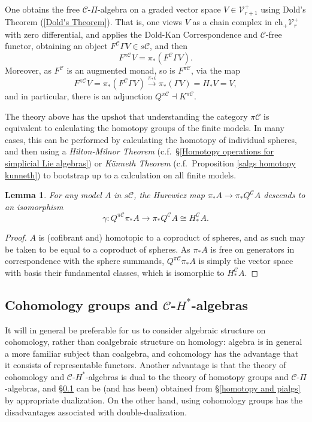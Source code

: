 \documentclass[11pt]{amsart} \renewcommand{\baselinestretch}{1.2}
\theoremstyle{plain}
\newtheorem{lem}[thm]{Lemma}
\numberwithin{equation}{section} %
\theoremstyle{plain}
\newtheorem{lem}[thm]{Lemma}
\numberwithin{equation}{chapter} %
\renewcommand{\to}{\longrightarrow}
\newcommand{\calC}{\mathcal{C}}
\newcommand{\calV}{\mathcal{V}}
\newcommand{\calc}{\mathcal{C}}
\newcommand{\vect}[2]{\calV^{#1}_{#2}}
\newcommand{\PA}[1]{\pi#1}
\newcommand{\complexes}{\mathrm{ch}_+}
\newcommand{\SubsectionOrSection}[1]{\subsection{#1}}
\begin{document}
\begin{Pi-algebras and cohomology algebras}
One obtains the free $\calc$-$\Pi$-algebra on a graded vector space $V\in \vect{+}{r+1}$ using Dold's Theorem (\ref{Dold's Theorem}). That is, one views $V$ as a chain complex in $\complexes\vect{+}{r}$ with zero differential, and applies the Dold-Kan Correspondence and $\calc$-free functor, obtaining an object $F^\calc\Gamma V\in s\calc$, and then
\[F^{\PA{\calc}}V=\pi_*(F^\calc\Gamma V).\]
Moreover, as $F^\calc $ is an augmented monad, so is $F^{\PA{\calc}}$, via the map
\[F^{\PA{\calc}}V=\pi_*(F^\calc\Gamma V)\overset{\pi_*\epsilon}{\to}\pi_*(\Gamma V)=H_*V=V,\]
and in particular, there is an adjunction $Q^{\PA{\calc}}\dashv K^{\PA{\calc}}$.

The theory above has the upshot that understanding the category $\PA{\calc}$ is equivalent to calculating the homotopy groups of the finite models. In many cases, this can be performed by calculating the homotopy of individual spheres, and then using a \emph{Hilton-Milnor Theorem} (c.f.\ \S\ref{Homotopy operations for simplicial Lie algebras}) or \emph{K\"unneth Theorem} (c.f.\ Proposition \ref{salgs homotopy kunneth}) to bootstrap up to a calculation on all finite models.



\begin{lem}
\label{Q of a model}
For any model $A$ in $s\calc$, the Hurewicz map $\pi_*A\to \pi_*Q^\calc A$ descends to an isomorphism
\[\gamma:Q^{\PA{\calc}}\pi_* A\to \pi_* Q^{\calc}A\cong H_*^{\calc}A.\]
\end{lem}
\begin{proof} $A$ is (cofibrant and) homotopic to a coproduct of spheres, and as such may be taken to be equal to a coproduct of spheres. As $\pi_* A$ is free on generators in correspondence with the sphere summands, $Q^{\PA{\calc}}\pi_* A$ is simply the vector space with basis their fundamental classes, which is isomorphic to $H_*^{\calc}A$.
\end{proof}
\SubsectionOrSection{Cohomology groups and $\calc$-$H^*$-algebras}\label{cohomology and Halgs}
It will in general be preferable for us to consider algebraic structure on cohomology, rather than coalgebraic structure on homology: algebra is in general a more familiar subject than coalgebra, and cohomology has the advantage that it consists of representable functors. 
Another advantage is that the theory of cohomology and $\calC$-$H^*$-algebras is dual to the theory of homotopy groups and $\calC$-$\Pi$-algebras, and \S\ref{cohomology and Halgs} can be (and has been) obtained from \S\ref{homotopy and pialgs} by appropriate dualization. On the other hand, using cohomology groups has the disadvantages associated with double-dualization.


\end{Pi-algebras and cohomology algebras}
\end{document}
